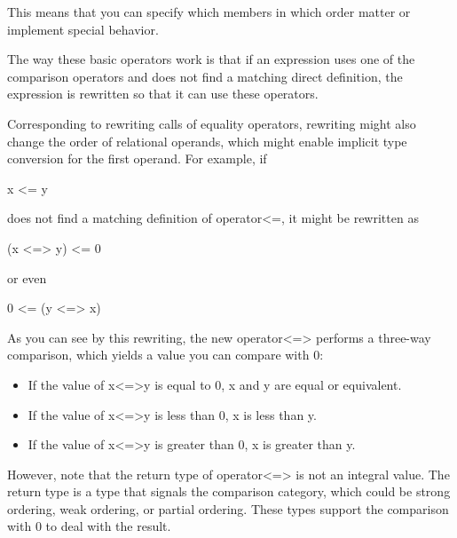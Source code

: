This means that you can specify which members in which order matter or implement special behavior.

The way these basic operators work is that if an expression uses one of the comparison operators and does not find a matching direct definition, the expression is rewritten so that it can use these operators.

Corresponding to rewriting calls of equality operators, rewriting might also change the order of relational operands, which might enable implicit type conversion for the first operand. For example, if

\begin{cpp}
x <= y
\end{cpp}

does not find a matching definition of operator<=, it might be rewritten as

\begin{cpp}
(x <=> y) <= 0
\end{cpp}

or even

\begin{cpp}
0 <= (y <=> x)
\end{cpp}

As you can see by this rewriting, the new operator<=> performs a three-way comparison, which yields a value you can compare with 0:

\begin{itemize}
\item
If the value of x<=>y is equal to 0, x and y are equal or equivalent.

\item
If the value of x<=>y is less than 0, x is less than y.

\item
If the value of x<=>y is greater than 0, x is greater than y.
\end{itemize}

However, note that the return type of operator<=> is not an integral value. The return type is a type that signals the comparison category, which could be strong ordering, weak ordering, or partial ordering. These types support the comparison with 0 to deal with the result.










